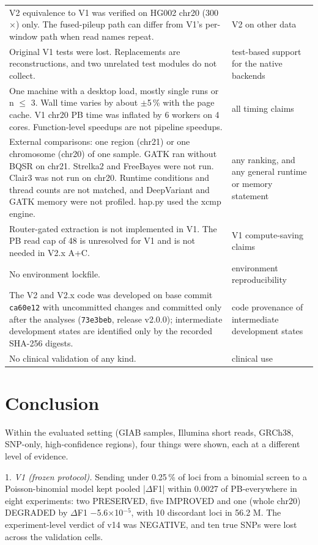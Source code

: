 \documentclass[11pt,a4paper]{article}
\makeatletter
\newcommand{\needspace}[1]{\par\ifdim\pagegoal=\maxdimen\else\dimen@=\pagegoal\advance\dimen@-\pagetotal\ifdim\dimen@<#1\relax\newpage\fi\fi}
\makeatother
\begin{document}
{\begin{xltabular}{\linewidth}{>{\hsize\raggedright\arraybackslash}X>{\hsize\raggedright\arraybackslash}X}
V2 equivalence to V1 was verified on HG002 chr20 (300$\times$) only. The fused-pileup path can differ from V1's per-window path when read names repeat. & V2 on other data \\
Original V1 tests were lost. Replacements are reconstructions, and two unrelated test modules do not collect. & test-based support for the native backends \\
One machine with a desktop load, mostly single runs or n $\le$ 3. Wall time varies by about $\pm$5\,\% with the page cache. V1 chr20 PB time was inflated by 6 workers on 4 cores. Function-level speedups are not pipeline speedups. & all timing claims \\
External comparisons: one region (chr21) or one chromosome (chr20) of one sample. GATK ran without BQSR on chr21. Strelka2 and FreeBayes were not run. Clair3 was not run on chr20. Runtime conditions and thread counts are not matched, and DeepVariant and GATK memory were not profiled. hap.py used the xcmp engine. & any ranking, and any general runtime or memory statement \\
Router-gated extraction is not implemented in V1. The PB read cap of 48 is unresolved for V1 and is not needed in V2.x A+C. & V1 compute-saving claims \\
No environment lockfile. & environment reproducibility \\
The V2 and V2.x code was developed on base commit \texttt{ca60e12} with uncommitted changes and committed only after the analyses (\texttt{73e3beb}, release v2.0.0); intermediate development states are identified only by the recorded SHA-256 digests. & code provenance of intermediate development states \\
No clinical validation of any kind. & clinical use \\
\bottomrule
\end{xltabular}
}

\FloatBarrier
\needspace{10\baselineskip}
\section{\texorpdfstring{Conclusion}{Conclusion}}
Within the evaluated setting (GIAB samples, Illumina short reads, GRCh38, SNP-only, high-confidence regions), four things were shown, each at a different level of evidence.

1. \emph{V1 (frozen protocol).} Sending under 0.25\,\% of loci from a binomial screen to a Poisson-binomial model kept pooled |$\Delta$F1| within 0.0027 of PB-everywhere in eight experiments: two PRESERVED, five IMPROVED and one (whole chr20) DEGRADED by $\Delta$F1 $-$5.6$\times$10$^{-5}$, with 10 discordant loci in 56.2 M. The experiment-level verdict of v14 was NEGATIVE, and ten true SNPs were lost across the validation cells.
\end{document}
